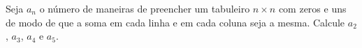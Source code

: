 Seja $a_n$ o número de maneiras de preencher um tabuleiro $n \times n$ com zeros e uns de modo de que a soma em cada linha e em cada coluna seja a mesma. Calcule $a_2$, $a_3$, $a_4$ e $a_5$.
